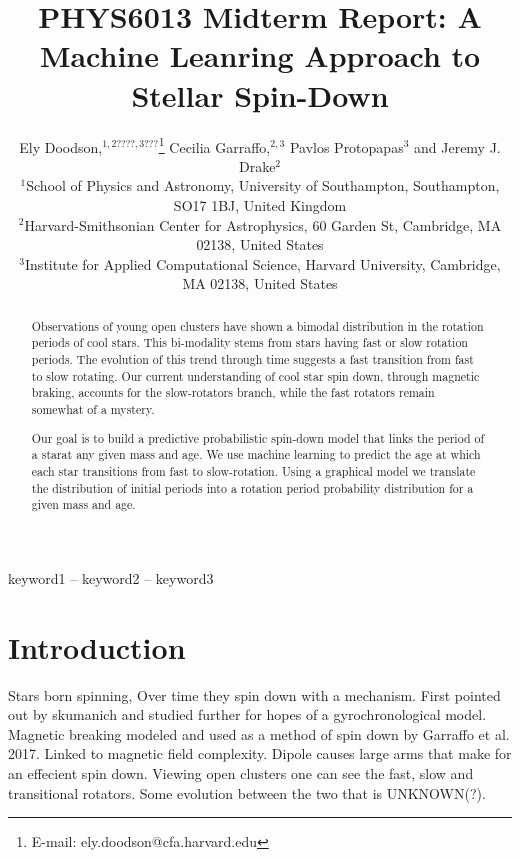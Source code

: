 \documentclass[fleqn,usenatbib]{mnras}
\title{PHYS6013 Midterm Report: A Machine Leanring Approach to Stellar Spin-Down}
\author[E. J. Doodson et al.]{
Ely Doodson,$^{1,2????,3???}$\thanks{E-mail: ely.doodson@cfa.harvard.edu}
Cecilia Garraffo,$^{2,3}$
Pavlos Protopapas$^{3}$
and Jeremy J. Drake$^{2}$
\\
$^{1}$School of Physics and Astronomy, University of Southampton,
Southampton, SO17 1BJ, United Kingdom\\
$^{2}$Harvard-Smithsonian Center for Astrophysics, 60 Garden St, Cambridge, MA 02138, United States \\
$^{3}$Institute for Applied Computational Science, Harvard University, Cambridge, MA 02138, United States
}
\begin{document}
\label{firstpage}
\pagerange{\pageref{firstpage}--\pageref{lastpage}}
\maketitle

\begin{abstract}
	Observations of young open clusters have shown a bimodal distribution in the rotation
	periods of cool stars.
	This bi-modality stems from stars having fast or slow rotation periods.
	The evolution of this trend through time suggests a fast transition from fast to slow rotating.
	Our current understanding of cool star spin down, through magnetic braking, accounts for the slow-rotators branch, while the fast rotators remain somewhat of a mystery.

	Our goal is to build a predictive probabilistic spin-down model that links the period of a starat any given mass and age.
	We use machine learning to predict the age at which each star transitions from fast to slow-rotation.
	Using a graphical model we translate the distribution of initial periods into a rotation period probability distribution for a given mass and age.
\end{abstract}

\begin{keywords}
	keyword1 -- keyword2 -- keyword3
\end{keywords}



\section{Introduction}

Stars born spinning, Over time they spin down with a mechanism.
First pointed out by skumanich and studied further for hopes of a gyrochronological model.
Magnetic breaking modeled and used as a method of spin down by Garraffo et al. 2017.
Linked to magnetic field complexity.
Dipole causes large arms that make for an effecient spin down.
Viewing open clusters one can see the fast, slow and transitional rotators.
Some evolution between the two that is UNKNOWN(?).
\end{document}
